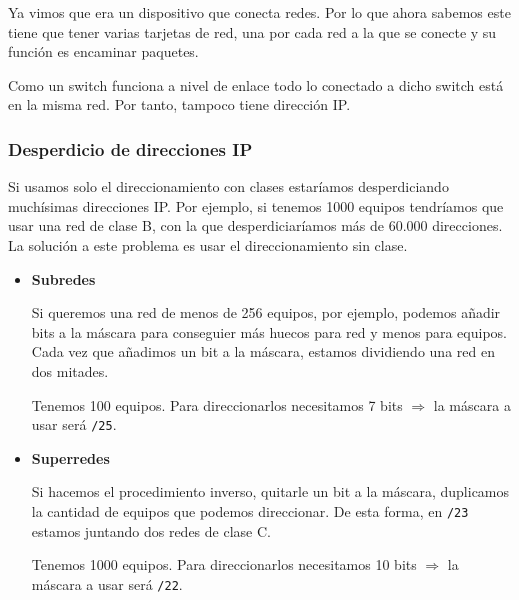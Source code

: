 \begin{definicion}[Router]
    Ya vimos que era un dispositivo que conecta redes. Por lo que ahora sabemos este tiene que tener varias tarjetas de red, una por cada red a la que se conecte y su función es encaminar paquetes. 
\end{definicion}

\begin{observacion}
    Como un switch funciona a nivel de enlace todo lo conectado a dicho switch está en la misma red. Por tanto, tampoco tiene dirección IP.
\end{observacion}


\subsubsection{Desperdicio de direcciones IP}

Si usamos solo el direccionamiento con clases estaríamos desperdiciando muchísimas direcciones IP. Por ejemplo, si tenemos 1000 equipos tendríamos que usar una red de clase B, con la que desperdiciaríamos más de 60.000 direcciones. La solución a este problema es usar el direccionamiento sin clase. 

\begin{itemize}
    \item \textbf{Subredes}\

    Si queremos una red de menos de 256 equipos, por ejemplo, podemos añadir bits a la máscara para conseguier más huecos para red y menos para equipos. Cada vez que añadimos un bit a la máscara, estamos dividiendo una red en dos mitades. 
    \begin{ejemplo}
        Tenemos 100 equipos. Para direccionarlos necesitamos 7 bits $\Longrightarrow $ la máscara a usar será \verb|/25|. 
    \end{ejemplo}
        \item \textbf{Superredes}\

            Si hacemos el procedimiento inverso, quitarle un bit a la máscara, duplicamos la cantidad de equipos que podemos direccionar. De esta forma, en \verb|/23| estamos juntando dos redes de clase C. 
    \begin{ejemplo}
        Tenemos 1000 equipos. Para direccionarlos necesitamos 10 bits $\Longrightarrow $ la máscara a usar será \verb|/22|. 
    \end{ejemplo}
\end{itemize}


